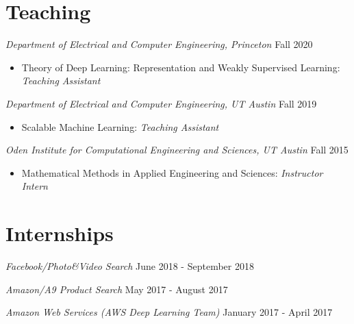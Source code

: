 \documentclass[margin, 10pt]{res} %
\begin{document}
\begin{resume}
\section{Teaching}
{\sl Department of Electrical and Computer Engineering, Princeton} \hfill Fall 2020
\begin{itemize}
	\item Theory of Deep Learning: Representation and Weakly Supervised Learning: {\sl Teaching Assistant}
\end{itemize}


{\sl Department of Electrical and Computer Engineering, UT Austin} \hfill Fall 2019
\begin{itemize}
  \item Scalable Machine Learning: {\sl Teaching Assistant}
  \end{itemize}

{\sl Oden Institute for Computational Engineering and Sciences, UT Austin} \hfill Fall 2015
\begin{itemize}
  \item Mathematical Methods in Applied Engineering and Sciences: {\sl Instructor Intern}
\end{itemize}


\section{Internships}

{\sl Facebook/Photo\&Video Search} \hfill June 2018 - September 2018


{\sl Amazon/A9 Product Search} \hfill May 2017 - August 2017

{\sl Amazon Web Services (AWS Deep Learning Team)} \hfill January 2017 - April 2017


\end{resume}
\end{document}
